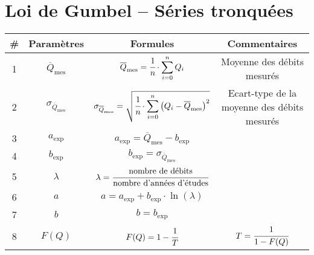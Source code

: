 \section{Loi de Gumbel -- Séries tronquées}
\begin{table}[H]
    \centering
    \begin{tabular}{c|c|c|c}
        \# & \textbf{Paramètres}                & \textbf{Formules}                                                                                                                         & \textbf{Commentaires}      \\
        \hline
        1  & $\overline{Q}_\text{mes}$          & $\overline{Q}_\text{mes} = \cfrac{1}{n} \cdot \displaystyle{\sum_{i=0}^{n} Q_i}$                                                          & Moyenne des débits mesurés \\
        \hline
        2  & $\sigma_{\overline{Q}_\text{mes}}$ & $\sigma_{\overline{Q}_\text{mes}} = \sqrt{\cfrac{1}{n} \cdot \displaystyle{\sum_{i=0}^{n} \left(Q_i - \overline{Q}_\text{mes}\right)^2}}$ & Ecart-type de la moyenne des débits mesurés \\
        \hline
        3  & $a_\text{exp}$                     & $a_\text{exp} = \overline{Q}_\text{mes} - b_\text{exp}$                                                                                   & \\
        \hline
        4  & $b_\text{exp}$                     & $b_\text{exp} = \sigma_{\overline{Q}_\text{mes}}$                                                                                         & \\
        \hline
        5  & $\lambda$                          & $\lambda = \cfrac{\text{nombre de débits}}{\text{nombre d'années d'études}}$                                                                     & \\                                               
        \hline
        6  & $a$                                & $a = a_\text{exp} + b_\text{exp} \cdot \ln \left(\lambda\right)$                                                                          & \\                                                                                         
        \hline
        7  & $b$                                & $b = b_\text{exp}$                                                                                                                        & \\
        \hline
        8  & $F(Q)$                             & $F(Q) = 1-\cfrac{1}{T}$                                                                                                                   & $T = \cfrac{1}{1-F(Q)}$ \\

\end{tabular}
\end{table}
